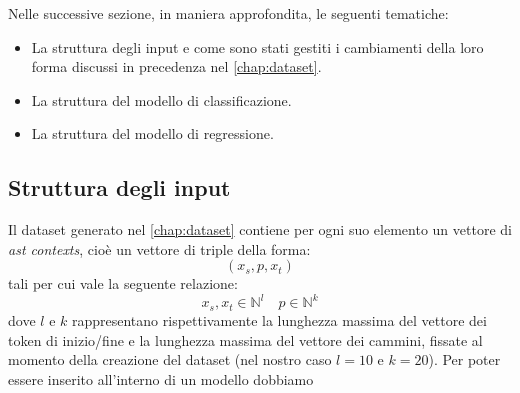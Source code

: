 Nelle successive sezione, in maniera approfondita, le seguenti tematiche:
    \begin{itemize}
        \item La struttura degli input e come sono stati gestiti i cambiamenti della loro forma discussi in precedenza nel \autoref{chap:dataset}.
        \item La struttura del modello di classificazione.
        \item La struttura del modello di regressione.
    \end{itemize}


\subsection{Struttura degli input}
Il dataset generato nel \autoref{chap:dataset} contiene per ogni suo elemento un vettore di \textit{ast contexts}, cioè un vettore di triple della forma:
    \[(x_s, p, x_t)\]
tali per cui vale la seguente relazione:
    \[x_s, x_t \in \mathbb{N}^{l} \quad p \in \mathbb{N}^{k}\]
dove $l$ e $k$ rappresentano rispettivamente la lunghezza massima del vettore dei token di inizio/fine e la lunghezza massima del vettore dei cammini, fissate al momento della creazione del dataset (nel nostro caso $l=10$ e $k=20$).
Per poter essere inserito all'interno di un modello dobbiamo 























